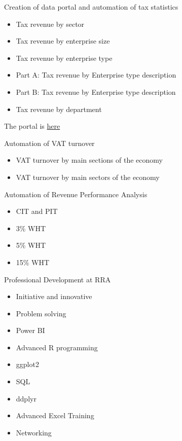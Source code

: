 \documentclass[ignorenonframetext,]{beamer}
\providecommand{\tightlist}{%
  \setlength{\itemsep}{0pt}\setlength{\parskip}{0pt}}
\begin{document}
\begin{frame}{Creation of data portal and automation of tax statistics}
\protect\hypertarget{creation-of-data-portal-and-automation-of-tax-statistics}{}

\begin{itemize}
\tightlist
\item
  Tax revenue by sector
\item
  Tax revenue by enterprise size
\item
  Tax revenue by enterprise type
\item
  Part A: Tax revenue by Enterprise type description
\item
  Part B: Tax revenue by Enterprise type description
\item
  Tax revenue by department
\end{itemize}

The portal is \href{https://bit.ly/taxrevenue}{here}

\end{frame}

\begin{frame}{Automation of VAT turnover}
\protect\hypertarget{automation-of-vat-turnover}{}

\begin{itemize}
\tightlist
\item
  VAT turnover by main sections of the economy
\item
  VAT turnover by main sectors of the economy
\end{itemize}

\end{frame}

\begin{frame}{Automation of Revenue Performance Analysis}
\protect\hypertarget{automation-of-revenue-performance-analysis}{}

\begin{itemize}
\tightlist
\item
  CIT and PIT
\item
  3\% WHT
\item
  5\% WHT
\item
  15\% WHT
\end{itemize}

\end{frame}

\begin{frame}{Professional Development at RRA}
\protect\hypertarget{professional-development-at-rra}{}

\begin{itemize}
\tightlist
\item
  Initiative and innovative
\item
  Problem solving
\item
  Power BI
\item
  Advanced R programming
\item
  ggplot2
\item
  SQL
\item
  ddplyr
\item
  Advanced Excel Training
\item
  Networking
\end{itemize}

\end{frame}
\end{document}
